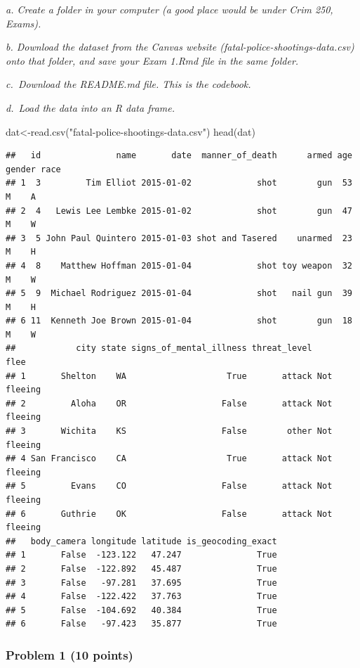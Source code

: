 \documentclass[
]{article}
\newenvironment{Shaded}{\begin{snugshade}}{\end{snugshade}}
\newcommand{\FunctionTok}[1]{\textcolor[rgb]{0.00,0.00,0.00}{#1}}
\newcommand{\NormalTok}[1]{#1}
\newcommand{\OtherTok}[1]{\textcolor[rgb]{0.56,0.35,0.01}{#1}}
\newcommand{\StringTok}[1]{\textcolor[rgb]{0.31,0.60,0.02}{#1}}
\begin{document}
\emph{a. Create a folder in your computer (a good place would be under
Crim 250, Exams).}

\emph{b. Download the dataset from the Canvas website
(fatal-police-shootings-data.csv) onto that folder, and save your Exam
1.Rmd file in the same folder.}

\emph{c.~Download the README.md file. This is the codebook.}

\emph{d.~Load the data into an R data frame.}

\begin{Shaded}
\begin{Highlighting}[]
\NormalTok{dat}\OtherTok{\textless{}{-}}\FunctionTok{read.csv}\NormalTok{(}\StringTok{"fatal{-}police{-}shootings{-}data.csv"}\NormalTok{)}
\FunctionTok{head}\NormalTok{(dat)}
\end{Highlighting}
\end{Shaded}

\begin{verbatim}
##   id               name       date  manner_of_death      armed age gender race
## 1  3         Tim Elliot 2015-01-02             shot        gun  53      M    A
## 2  4   Lewis Lee Lembke 2015-01-02             shot        gun  47      M    W
## 3  5 John Paul Quintero 2015-01-03 shot and Tasered    unarmed  23      M    H
## 4  8    Matthew Hoffman 2015-01-04             shot toy weapon  32      M    W
## 5  9  Michael Rodriguez 2015-01-04             shot   nail gun  39      M    H
## 6 11  Kenneth Joe Brown 2015-01-04             shot        gun  18      M    W
##            city state signs_of_mental_illness threat_level        flee
## 1       Shelton    WA                    True       attack Not fleeing
## 2         Aloha    OR                   False       attack Not fleeing
## 3       Wichita    KS                   False        other Not fleeing
## 4 San Francisco    CA                    True       attack Not fleeing
## 5         Evans    CO                   False       attack Not fleeing
## 6       Guthrie    OK                   False       attack Not fleeing
##   body_camera longitude latitude is_geocoding_exact
## 1       False  -123.122   47.247               True
## 2       False  -122.892   45.487               True
## 3       False   -97.281   37.695               True
## 4       False  -122.422   37.763               True
## 5       False  -104.692   40.384               True
## 6       False   -97.423   35.877               True
\end{verbatim}

\hypertarget{problem-1-10-points}{%
\subsubsection{Problem 1 (10 points)}\label{problem-1-10-points}}
\end{document}
